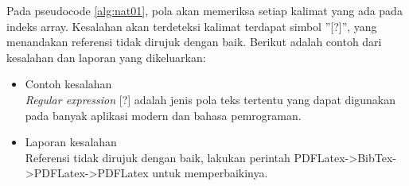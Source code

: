 \begin{enumerate}
	Pada pseudocode \ref{alg:nat01}, pola akan memeriksa setiap kalimat yang ada pada indeks array. Kesalahan akan terdeteksi kalimat terdapat simbol ''[?]'', yang menandakan referensi tidak dirujuk dengan baik. Berikut adalah contoh dari kesalahan dan laporan yang dikeluarkan:
	
	\begin{itemize}
		\item Contoh kesalahan \\
		\textit{Regular expression} [?] adalah jenis pola teks tertentu yang dapat digunakan pada banyak aplikasi modern dan bahasa pemrograman.
		\item Laporan kesalahan \\
		Referensi tidak dirujuk dengan baik, lakukan perintah PDFLatex->BibTex->PDFLatex->PDFLatex untuk memperbaikinya.
	\end{itemize}		
	
\end{enumerate}